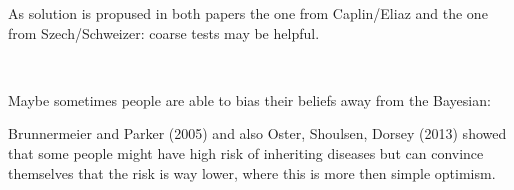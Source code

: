 As solution is propused in both papers the one from Caplin/Eliaz and the one from Szech/Schweizer: coarse tests may be helpful.

~\newline

Maybe sometimes people are able to bias their beliefs away from the Bayesian:
 
Brunnermeier and Parker (2005) and also Oster, Shoulsen, Dorsey (2013) showed that some people might have high risk of inheriting diseases but can convince themselves that the risk is way lower, where this is more then simple optimism. \\



\newpage